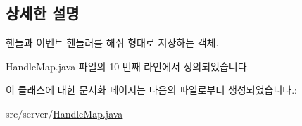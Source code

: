 \subsection{상세한 설명}
핸들과 이벤트 핸들러를 해쉬 형태로 저장하는 객체. 

Handle\-Map.\-java 파일의 10 번째 라인에서 정의되었습니다.



이 클래스에 대한 문서화 페이지는 다음의 파일로부터 생성되었습니다.\-:\begin{DoxyCompactItemize}
\item 
src/server/\hyperlink{_handle_map_8java}{Handle\-Map.\-java}\end{DoxyCompactItemize}

